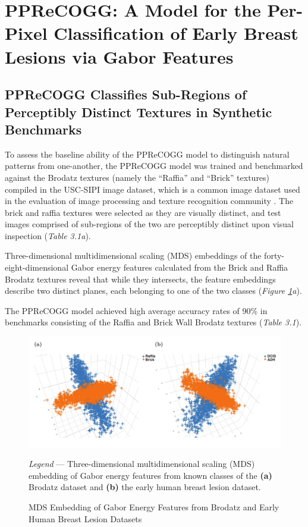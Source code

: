 \section{PPReCOGG: A Model for the Per-Pixel Classification of Early Breast Lesions via Gabor Features}

\subsection{PPReCOGG Classifies Sub-Regions of Perceptibly Distinct Textures in Synthetic Benchmarks}

To assess the baseline ability of the PPReCOGG model to distinguish natural patterns from one-another, the PPReCOGG model was trained and benchmarked against the Brodatz textures (namely the ``Raffia'' and ``Brick'' textures) compiled in the USC-SIPI image dataset, which is a common image dataset used in the evaluation of image processing and texture recognition community \citep{weber1997}. The brick and raffia textures were selected as they are visually distinct, and test images comprised of sub-regions of the two are perceptibly distinct upon visual inspection (\emph{Table 3.1a}).\par

Three-dimensional  multidimensional scaling (MDS) embeddings of the forty-eight-dimensional Gabor energy features calculated from the Brick and Raffia Brodatz textures reveal that while they intersects, the feature embeddings describe two distinct planes, each belonging to one of the two classes (\emph{Figure \ref{embeddings}a}).

The PPReCOGG model achieved high average accuracy rates of 90\% in benchmarks consisting of the Raffia and Brick Wall Brodatz textures (\emph{Table 3.1}).\par


\begin{figure}[p]
	\begin{center}
	\caption{MDS Embedding of Gabor Energy Features from Brodatz and Early Human Breast Lesion Datasets \label{embeddings}}
	\end{center}
	\includegraphics[width=170mm]{figures/embeddings/figure.pdf}
	 \begin{singlespace}
	 	\textit{Legend} --- Three-dimensional multidimensional scaling (MDS) embedding of Gabor energy features from known classes of the \textbf{(a)} Brodatz dataset and \textbf{(b)} the early human breast lesion dataset.
	 \end{singlespace}
	
\end{figure}



